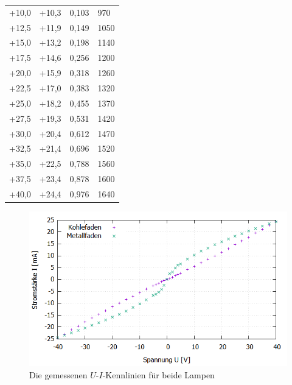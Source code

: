 \documentclass{scrartcl}
\begin{document}
\begin{table}[H]
\begin{center}
\begin{tabular}{l|l|l|l}
+10,0   &   +10,3   &   0,103   &    970 \\
+12,5   &   +11,9   &   0,149   &   1050 \\
+15,0   &   +13,2   &   0,198   &   1140 \\
+17,5   &   +14,6   &   0,256   &   1200 \\
+20,0   &   +15,9   &   0,318   &   1260 \\
+22,5   &   +17,0   &   0,383   &   1320 \\
+25,0   &   +18,2   &   0,455   &   1370 \\
+27,5   &   +19,3   &   0,531   &   1420 \\
+30,0   &   +20,4   &   0,612   &   1470 \\
+32,5   &   +21,4   &   0,696   &   1520 \\
+35,0   &   +22,5   &   0,788   &   1560 \\
+37,5   &   +23,4   &   0,878   &   1600 \\
+40,0   &   +24,4   &   0,976   &   1640 
\end{tabular}
\end{center}
\label{tab:Metallfadenlampe}
\end{table}

\begin{figure}[H]
  \centering
    \includegraphics[scale=0.5]{V1_Kennlinien.PNG}
  \caption{Die gemessenen $U$-$I$-Kennlinien für beide Lampen}
  \label{fig:V1_Kennlinien}
\end{figure}
\end{document}
